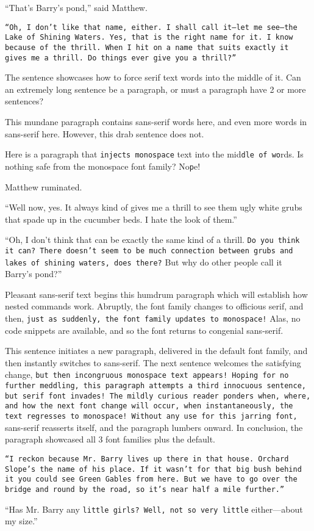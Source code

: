 \documentclass[a4paper]{article}
\begin{document}
\textsf{``That's Barry's pond,'' said Matthew.}

\texttt{``Oh, I don't like that name, either. I shall call it---let me see---the Lake of Shining Waters. Yes, that is the right name for it. I know because of the thrill. When I hit on a name that suits exactly it gives me a thrill. Do things ever give you a thrill?''}

The sentence showcases \textrm{how to force serif text words} into the middle of it. Can an extremely long sentence be a paragraph, or must a paragraph have 2 or more sentences?

This mundane paragraph contains \textsf{sans-serif} words here, and even more \textsf{words in sans-serif here}. However, this drab sentence does not.

Here is a paragraph that \texttt{injects monospace} text into the mid\texttt{dle of wo}rds. Is nothing safe from the monospace font family? No\texttt{p}e!

Mat\textrm{thew rumin}ated.

``Well now, yes. \textsf{It always kind of gives me a thrill to see them ugly white grubs that spade up in the cucumber beds.} I hate the look of them.''

``Oh, I don't think that can be exactly the same kind of a thrill. \texttt{Do you think it can? There doesn't seem to be much connection between grubs and lakes of shining waters, does there?} But why do other people call it Barry's pond?''

\textsf{Pleasant sans-serif text begins this humdrum paragraph which will establish how nested commands work. \textrm{Abruptly, the font family changes to officious serif,} and then, \texttt{just as suddenly, the font family updates to monospace!} Alas, no code snippets are available, and so the font returns to congenial sans-serif.}

This sentence initiates a new paragraph, delivered in the default font family, \textsf{and then instantly switches to sans-serif. The next sentence welcomes the satisfying change, \texttt{but then incongruous monospace text appears! Hoping for no further meddling, this paragraph attempts a third innocuous sentence, \textrm{but serif font invades! The mildly curious reader ponders when, where, and how the next font change will occur,} when instantaneously, the text regresses to monospace! Without any use for this jarring font,} sans-serif reasserts itself, and the paragraph lumbers onward. In conclusion, the paragraph showcased all 3 font families} plus the default.

\texttt{``I reckon because Mr. Barry lives up there in that house. \textrm{Orchard Slope's the name of his place. }\textsf{If it wasn't for that big bush behind it you could see Green Gables from here.} But we have to go over the bridge and round by the road, so it's near half a mile further.''}

``Has \textsf{Mr. Barry any \texttt{little girls? Well, \textrm{not so} very little} either---about my} size.''
\end{document}
